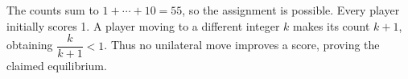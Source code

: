 The counts sum to $ 1+\cdots+10=55 $, so the assignment is possible. Every player initially scores 1. A player moving to a different integer $ k $ makes its count $ k+1 $, obtaining $\dfrac{k}{k+1}<1 $. Thus no unilateral move improves a score, proving the claimed equilibrium.
